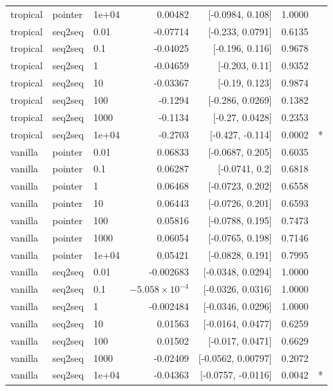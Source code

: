 \documentclass[10pt]{article}
\begin{document}
{\begin{longtable}{lllrrrl}
tropical & pointer & 1e+04 & 0.00482 & [-0.0984, 0.108] & 1.0000 & \\
tropical & seq2seq & 0.01 & -0.07714 & [-0.233, 0.0791] & 0.6135 & \\
tropical & seq2seq & 0.1 & -0.04025 & [-0.196, 0.116] & 0.9678 & \\
tropical & seq2seq & 1 & -0.04659 & [-0.203, 0.11] & 0.9352 & \\
tropical & seq2seq & 10 & -0.03367 & [-0.19, 0.123] & 0.9874 & \\
tropical & seq2seq & 100 & -0.1294 & [-0.286, 0.0269] & 0.1382 & \\
tropical & seq2seq & 1000 & -0.1134 & [-0.27, 0.0428] & 0.2353 & \\
tropical & seq2seq & 1e+04 & -0.2703 & [-0.427, -0.114] & 0.0002 & *\\
vanilla & pointer & 0.01 & 0.06833 & [-0.0687, 0.205] & 0.6035 & \\
vanilla & pointer & 0.1 & 0.06287 & [-0.0741, 0.2] & 0.6818 & \\
vanilla & pointer & 1 & 0.06468 & [-0.0723, 0.202] & 0.6558 & \\
vanilla & pointer & 10 & 0.06443 & [-0.0726, 0.201] & 0.6593 & \\
vanilla & pointer & 100 & 0.05816 & [-0.0788, 0.195] & 0.7473 & \\
vanilla & pointer & 1000 & 0.06054 & [-0.0765, 0.198] & 0.7146 & \\
vanilla & pointer & 1e+04 & 0.05421 & [-0.0828, 0.191] & 0.7995 & \\
vanilla & seq2seq & 0.01 & -0.002683 & [-0.0348, 0.0294] & 1.0000 & \\
vanilla & seq2seq & 0.1 & $-5.058\times10^{-4}$ & [-0.0326, 0.0316] & 1.0000 & \\
vanilla & seq2seq & 1 & -0.002484 & [-0.0346, 0.0296] & 1.0000 & \\
vanilla & seq2seq & 10 & 0.01563 & [-0.0164, 0.0477] & 0.6259 & \\
vanilla & seq2seq & 100 & 0.01502 & [-0.017, 0.0471] & 0.6629 & \\
vanilla & seq2seq & 1000 & -0.02409 & [-0.0562, 0.00797] & 0.2072 & \\
vanilla & seq2seq & 1e+04 & -0.04363 & [-0.0757, -0.0116] & 0.0042 & *\\
\bottomrule
\end{longtable}
}
\end{document}
